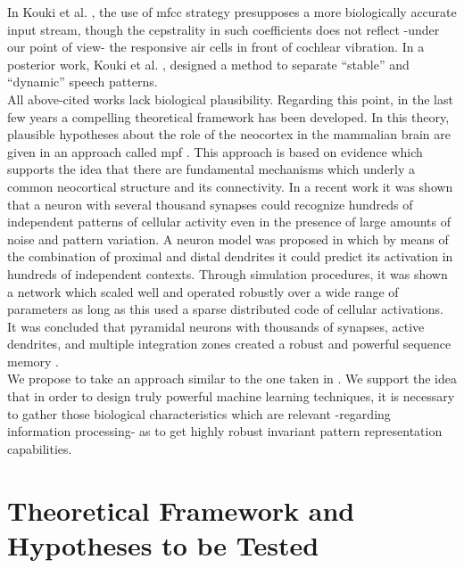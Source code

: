 \documentclass[11pt,a4paper]{article}
\begin{document}
In Kouki et al. \cite{kouki_2010},
the use of \gls{mfcc}
strategy presupposes a more biologically accurate input stream,
though the cepstrality in such coefficients does not reflect
-under our point of view-
the responsive air cells in front of cochlear vibration.
In a posterior work, Kouki et al. \cite{kouki_2011},
designed a method to separate “stable” and “dynamic” speech
patterns. \\

All above-cited works lack biological plausibility.
Regarding this point, in the last few years a compelling
theoretical framework has been developed.
In this theory, plausible hypotheses about the role of
the neocortex in the mammalian brain are given in an
approach called \gls{mpf}
\cite{hawkins_2004}.
This approach is based on evidence
which supports the idea that there are fundamental
mechanisms which underly a common neocortical
structure and its connectivity.
In a recent work it was shown that a neuron with
several thousand synapses could recognize hundreds
of independent patterns of cellular activity even
in the presence of large amounts of
noise and pattern variation.
A neuron model was proposed in which by means of
the combination of proximal and distal dendrites
it could predict its activation in hundreds of independent contexts.
Through simulation procedures, it was shown a network which
scaled well and operated robustly over a wide range of parameters as long as this
used a sparse distributed code of cellular activations.
It was concluded that pyramidal neurons with thousands of
synapses, active dendrites, and multiple integration zones
created a robust and powerful
sequence memory \cite{hawkins_2016}. \\

We propose to take an approach similar to the one taken in \cite{hawkins_2016}.
We support the idea that in order to design truly powerful machine
learning techniques,
it is necessary to gather those biological characteristics which are
relevant -regarding information processing- as to get highly
robust invariant pattern representation capabilities. \\













\section{Theoretical Framework and Hypotheses to be Tested}
\end{document}
